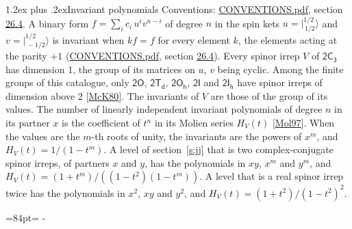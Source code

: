\documentclass[10pt,a4paper]{article}
\makeatletter
\renewcommand\section{\@startsection{section}{1}{\z@}{-3ex plus -1ex minus -.2ex}%
  {1.2ex plus .2ex}{\normalfont\large\sffamily\bfseries\color{parttitle}}}
\newcommand{\needspace}[1]{\par\penalty-100\begingroup\dimen0=#1\relax\dimen2=\pagegoal
  \advance\dimen2-\pagetotal\ifdim\dimen0>\dimen2\relax\ifdim\dimen2>0pt\vfil\break\fi\fi
  \endgroup}
\numberwithin{equation}{section}
\newcommand{\grp}[1]{\mathsf{#1}}
\newcommand{\jm}[2]{\bigl\lvert{}^{#1}_{\,#2}\bigr\rangle}
\makeatother
\begin{document}
\section{Invariant polynomials}\label{s:invariants}
Conventions: \href{../../CONVENTIONS.pdf}{CONVENTIONS.pdf}, section \href{../../CONVENTIONS.pdf\#conv.26.4}{26.4}.
\leavevmode\label{n:local.binary.form}A binary form $f = \sum_i c_i\, u^i v^{n-i}$ of degree $n$ in the spin kets $u = \jm{1/2}{1/2}$ and $v = \jm{1/2}{-1/2}$ is invariant when $k f = f$ for every element $k$, the elements acting at the parity $+1$ (\href{../../CONVENTIONS.pdf}{CONVENTIONS.pdf}, section \href{../../CONVENTIONS.pdf\#conv.26.4}{26.4}).
\leavevmode\label{n:function.hilbert}Every spinor irrep $V$ of $\grp{2C_{3}}$ has dimension 1, the group of its matrices on $u$, $v$ being cyclic. Among the finite groups of this catalogue, only $\grp{2O}$, $\grp{2T_{d}}$, $\grp{2O_{h}}$, $\grp{2I}$ and $\grp{2I_{h}}$ have spinor irreps of dimension above 2 [\href{../../../REFERENCES.pdf\#ref.McK80}{McK80}]. The invariants of $V$ are those of the group of its values. \label{n:local.partner.x}The number of linearly independent invariant polynomials of degree $n$ in its partner $x$ is the coefficient of $t^n$ in its Molien series $H_V(t)$ [\href{../../../REFERENCES.pdf\#ref.Mol97}{Mol97}]. When the values are the $m$-th roots of unity, the invariants are the powers of $x^{m}$, and $H_V(t) = 1/(1 - t^{m})$. A level of section~\ref{s:jj} that is two complex-conjugate spinor irreps, of partners $x$ and $y$, has the polynomials in $xy$, $x^{m}$ and $y^{m}$, and $H_V(t) = (1 + t^{m})/((1 - t^{2})(1 - t^{m}))$. A level that is a real spinor irrep twice has the polynomials in $x^{2}$, $xy$ and $y^{2}$, and $H_V(t) = (1 + t^{2})/(1 - t^{2})^{2}$.
\needspace{84pt}
\end{document}
